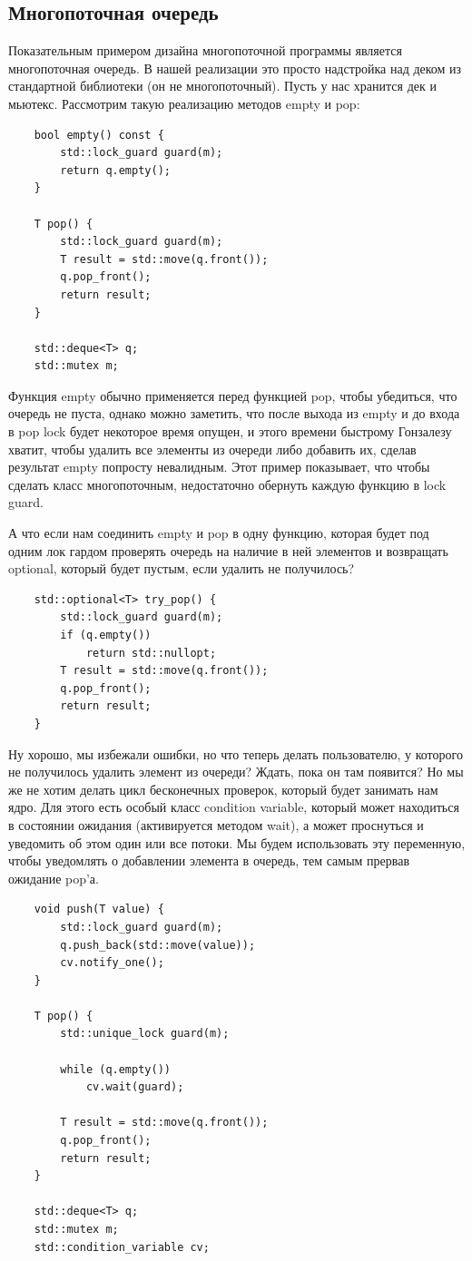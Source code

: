 \documentclass[12pt, a4paper]{article}
\begin{document}
\subsection{Многопоточная очередь}
Показательным примером дизайна многопоточной программы является многопоточная очередь. В нашей реализации это просто надстройка над деком из стандартной библиотеки (он не многопоточный). Пусть у нас хранится дек и мьютекс. Рассмотрим такую реализацию методов empty и pop:
\begin{verbatim}
	bool empty() const {
		std::lock_guard guard(m);
		return q.empty();
	}
	
	T pop() {
		std::lock_guard guard(m);
		T result = std::move(q.front());
		q.pop_front();
		return result;
	}
	
	std::deque<T> q;
	std::mutex m;
\end{verbatim}
Функция empty обычно применяется перед функцией pop, чтобы убедиться, что очередь не пуста, однако можно заметить, что после выхода из empty и до входа в pop lock будет некоторое время опущен, и этого времени быстрому Гонзалезу хватит, чтобы удалить все элементы из очереди либо добавить их, сделав результат empty попросту невалидным. Этот пример показывает, что чтобы сделать класс многопоточным, недостаточно обернуть каждую функцию в lock guard.\par
А что если нам соединить empty и pop в одну функцию, которая будет под одним лок гардом проверять очередь на наличие в ней элементов и возвращать optional, который будет пустым, если удалить не получилось?
\begin{verbatim}
	std::optional<T> try_pop() {
		std::lock_guard guard(m);
		if (q.empty())
			return std::nullopt;
		T result = std::move(q.front());
		q.pop_front();
		return result;
	}   
\end{verbatim}
Ну хорошо, мы избежали ошибки, но что теперь делать пользователю, у которого не получилось удалить элемент из очереди? Ждать, пока он там появится? Но мы же не хотим делать цикл бесконечных проверок, который будет занимать нам ядро. Для этого есть особый класс condition variable, который может находиться в состоянии ожидания (активируется методом wait), а может проснуться и уведомить об этом один или все потоки. Мы будем использовать эту переменную, чтобы уведомлять о добавлении элемента в очередь, тем самым прервав ожидание pop'а.
\begin{verbatim}
	void push(T value) {
		std::lock_guard guard(m);
		q.push_back(std::move(value));
		cv.notify_one();
	}
	
	T pop() {
		std::unique_lock guard(m);
		
		while (q.empty())
			cv.wait(guard);
		
		T result = std::move(q.front());
		q.pop_front();
		return result;
	}
	
	std::deque<T> q;
	std::mutex m;
	std::condition_variable cv;
\end{verbatim}
\end{document}
